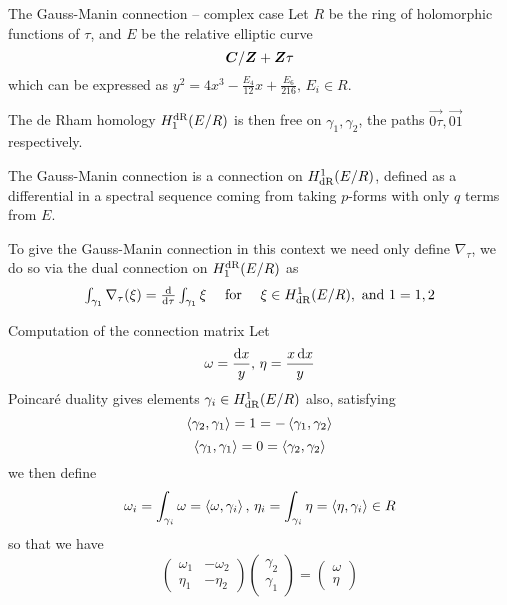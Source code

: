 \begin{frame}{The Gauss-Manin connection -- complex case}
    Let $R$ be the ring of holomorphic functions of $\tau$, and $E$ be the relative elliptic curve
    \[\bm C/ \bm{Z} + \bm{Z} \tau\]
    which can be expressed as 
    $y^{2}=4 x^{3}-\frac{E_4}{12} x+\frac{E_{6}}{216},\,E_i \in R$.\pause

    The de Rham homology $H^{\mathrm{dR}}_1(E/R)$ is then free on $\gamma_1,\gamma_2$, the paths $\overset{\to}{0\tau},\overset{\to}{01}$ respectively.\pause

    The Gauss-Manin connection is a connection on $H^1_{\mathrm{dR}}(E/R)$, defined as a differential in a spectral sequence coming from taking $p$-forms with only $q$ terms from $E$.\pause

    To give the Gauss-Manin connection in this context we need only define
    \(\nabla_\tau\), we do so via the dual connection on $H_1^{\mathrm{dR}}(E/R)$ as
    \begin{equation*}
        \begin{array}{l}
            \int_{\gamma_{{1}}} \nabla_{\tau}(\xi)=\frac{{\mathop{}\!\mathrm{d}}}{{\mathop{}\!\mathrm{d}} \tau} \int_{\gamma_{1}} \xi \quad \text { for } \quad \xi \in {H}_{\mathrm{dR}}^{1}({E} / {R}), \text { and } 1=1,2
        \end{array}
    \end{equation*}
\end{frame}

\begin{frame}{Computation of the connection matrix}
    Let
    \[ \omega = \frac{\mathop{}\!\mathrm{d} x}{y},\,\eta = \frac{x \mathop{}\!\mathrm{d} x}{y}\]
    Poincaré duality gives elements $\gamma_i \in H^1_{\mathrm{dR}}(E/R)$ also, satisfying
    \[\left\langle \gamma_2, \gamma_1 \right\rangle = 1 = -\left\langle \gamma_1, \gamma_2 \right\rangle \]
    \[\left\langle \gamma_1, \gamma_1 \right\rangle = 0 = \left\langle \gamma_2, \gamma_2 \right\rangle \]
    we then define
    \[ \omega_i  =\int_{\gamma_i} \omega = \left\langle \omega, \gamma_i \right\rangle,\,\eta_i = \int_{\gamma_i} \eta = \left\langle \eta, \gamma_i \right\rangle\in R\]
    so that we have
    $$
    \left(\begin{array}{cc}
            \omega_{1} & -\omega_{2} \\
            \eta_{1} & -\eta_{2}
            \end{array}\right)\left(\begin{array}{l}
            \gamma_{2} \\
            \gamma_{1}
            \end{array}\right)=\left(\begin{array}{l}
            \omega \\
            \eta
    \end{array}\right)
    $$
\end{frame}

